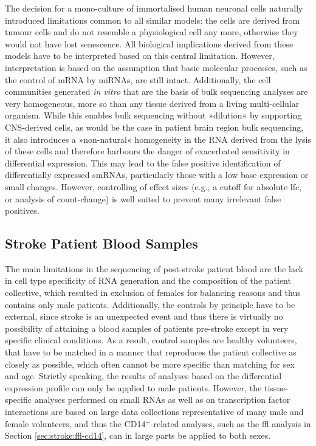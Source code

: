 The decision for a mono-culture of immortalised human neuronal cells naturally introduced limitations common to all similar models: the cells are derived from tumour cells and do not resemble a physiological cell any more, otherwise they would not have lost senescence. All biological implications derived from these models have to be interpreted based on this central limitation. However, interpretation is based on the assumption that basic molecular processes, such as the control of mRNA by miRNAs, are still intact. Additionally, the cell communities generated \emph{in vitro} that are the basis of bulk sequencing analyses are very homogeneous, more so than any tissue derived from a living multi-cellular organism. While this enables bulk sequencing without »dilution« by supporting CNS-derived cells, as would be the case in patient brain region bulk sequencing, it also introduces a »non-natural« homogeneity in the RNA derived from the lysis of these cells and therefore harbours the danger of exacerbated sensitivity in differential expression. This may lead to the false positive identification of differentially expressed smRNAs, particularly those with a low base expression or small changes. However, controlling of effect sizes (e.g., a cutoff for absolute \acl{lfc}, or analysis of count-change) is well suited to prevent many irrelevant false positives.

\subsection{Stroke Patient Blood Samples} \label{sec:discussion:stroke-blood}
The main limitations in the sequencing of post-stroke patient blood are the lack in cell type specificity of RNA generation and the composition of the patient collective, which resulted in exclusion of females for balancing reasons and thus contains only male patients. Additionally, the controls by principle have to be external, since stroke is an unexpected event and thus there is virtually no possibility of attaining a blood samples of patients pre-stroke except in very specific clinical conditions. As a result, control samples are healthy volunteers, that have to be matched in a manner that reproduces the patient collective as closely as possible, which often cannot be more specific than matching for sex and age. Strictly speaking, the results of analyses based on the differential expression profile can only be applied to male patients. However, the tissue-specific analyses performed on small RNAs as well as on transcription factor interactions are based on large data collections representative of many male and female volunteers, and thus the CD14$^+$-related analyses, such as the \acf{ffl} analysis in Section \ref{sec:stroke:ffl-cd14}, can in large parts be applied to both sexes.


